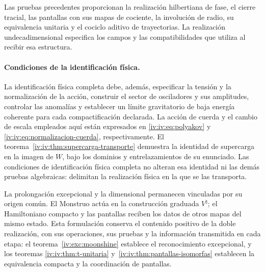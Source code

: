 Las pruebas precedentes proporcionan la realización
hilbertiana de fase, el cierre tracial, las pantallas
con sus mapas de cociente, la involución de radio,
su equivalencia unitaria y el cociclo aditivo de
trayectorias. La realización undecadimensional
especifica los campos y las compatibilidades que
utiliza al recibir esa estructura.

\paragraph{Condiciones de la identificación física.}
\label{iv:iv:condiciones-realizacion-fisica}
La identificación física completa debe, además,
especificar la tensión y la normalización de la acción,
construir el sector de osciladores y sus amplitudes,
controlar las anomalías y establecer un límite
gravitatorio de baja energía coherente para cada
compactificación declarada.
La acción de cuerda y el cambio de escala empleados
aquí están expresados en \eqref{iv:iv:eq:polyakov}
y \eqref{iv:iv:eq:normalizacion-cuerda}, respectivamente.
El teorema~\ref{iv:iv:thm:supercarga-transporte}
demuestra la identidad de supercarga en la imagen de
\(W\), bajo los dominios y entrelazamientos de su
enunciado. Las condiciones de identificación física
completa no alteran esa identidad ni las demás
pruebas algebraicas: delimitan la realización física
en la que se las transporta.

La prolongación excepcional y la dimensional
permanecen vinculadas por su origen común. El
Monstruo actúa en la construcción graduada
\(V^\natural\); el Hamiltoniano compacto y las
pantallas reciben los datos de otros mapas del
mismo estado. Esta formulación conserva el
contenido positivo de la doble realización,
con sus operaciones, sus pruebas y la información
transmitida en cada etapa: el teorema~\ref{iv:exc:moonshine}
establece el reconocimiento excepcional, y los teoremas
\ref{iv:iv:thm:t-unitaria} y~\ref{iv:iv:thm:pantallas-isomorfas}
establecen la equivalencia compacta y la coordinación de pantallas.
